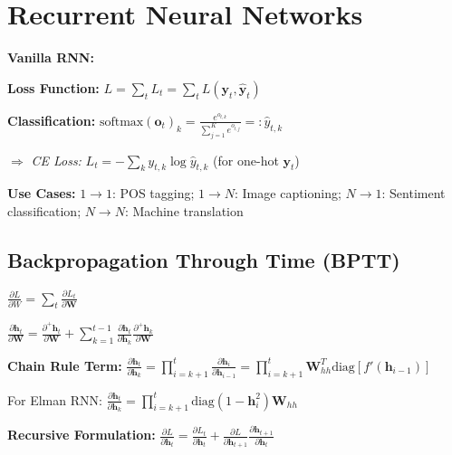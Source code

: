 \section{Recurrent Neural Networks}


\textbf{Vanilla RNN:} 

\textbf{Loss Function:} $L = \sum_t L_t = \sum_t L(\mathbf{y}_t, \hat{\mathbf{y}}_t)$

\textbf{Classification:}
$\text{softmax}(\mathbf{o}_t)_k = \frac{e^{o_{t,k}}}{\sum_{j=1}^K e^{o_{t,j}}} =: \hat{y}_{t,k}$ 

$\Rightarrow$ \textit{CE Loss:} $L_t = -\sum_k y_{t,k} \log \hat{y}_{t,k}$ (for one-hot $\mathbf{y}_t$)

\textbf{Use Cases:} $1 \to 1$: POS tagging; $1 \to N$: Image captioning; $N \to 1$: Sentiment classification; $N \to N$: Machine translation


\subsection{Backpropagation Through Time (BPTT)}

$\frac{\partial L}{\partial W} = \sum_t \frac{\partial L_t}{\partial \mathbf{W}} \quad$ 

$\frac{\partial \mathbf{h}_t}{\partial \mathbf{W}} = \frac{\partial^+ \mathbf{h}_t}{\partial \mathbf{W}} + \sum_{k=1}^{t-1} \frac{\partial \mathbf{h}_t}{\partial \mathbf{h}_k} \frac{\partial^+ \mathbf{h}_k}{\partial \mathbf{W}}$

\textbf{Chain Rule Term:} $\frac{\partial \mathbf{h}_t}{\partial \mathbf{h}_k} = \prod_{i=k+1}^t \frac{\partial \mathbf{h}_i}{\partial \mathbf{h}_{i-1}} = \prod_{i=k+1}^t \mathbf{W}_{hh}^T \text{diag}[f'(\mathbf{h}_{i-1})]$

For Elman RNN: $\frac{\partial \mathbf{h}_t}{\partial \mathbf{h}_k} = \prod_{i=k+1}^t \text{diag}(1 - \mathbf{h}_i^2) \mathbf{W}_{hh}$

\textbf{Recursive Formulation:}
$\frac{\partial L}{\partial \mathbf{h}_t} = \frac{\partial L_t}{\partial \mathbf{h}_t} + \frac{\partial L}{\partial \mathbf{h}_{t+1}} \frac{\partial \mathbf{h}_{t+1}}{\partial \mathbf{h}_t}$

